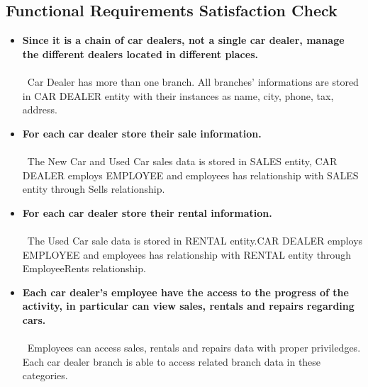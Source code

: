 \subsection{Functional Requirements Satisfaction Check}
\begin{itemize}
\item \textbf{Since it is a chain of car dealers, not a single car dealer, manage the different dealers located in different places.}\\\\
	\,
	Car Dealer has more than one branch. All branches’ informations are stored in CAR DEALER entity with their instances as name, city, phone, tax, address.
	\item \textbf{For each car dealer store their sale information.}\\\\
	\,
	The New Car and Used Car sales data is stored in SALES entity, CAR DEALER employs EMPLOYEE and employees has relationship with SALES entity through Sells relationship.
	\item \textbf{For each car dealer store their rental information.}\\\\
	\,
	The Used Car sale data is stored in RENTAL entity.CAR DEALER employs EMPLOYEE and employees has relationship with RENTAL entity through EmployeeRents relationship.
	\item \textbf{Each car dealer's employee have the access to the progress of the activity, in particular can view sales, rentals and repairs regarding cars.}\\\\
	\,
	Employees can access sales, rentals and repairs data with proper priviledges. Each car dealer branch is able to access related branch data in these categories.


\end{itemize}
